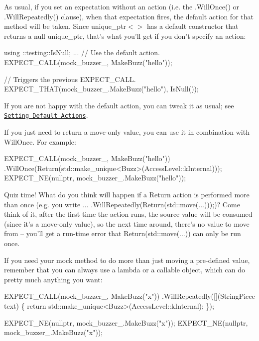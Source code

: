 As usual, if you set an expectation without an action (i.\+e. the {\ttfamily .Will\+Once()} or {\ttfamily .Will\+Repeatedly()} clause), when that expectation fires, the default action for that method will be taken. Since {\ttfamily unique\+\_\+ptr$<$$>$} has a default constructor that returns a null {\ttfamily unique\+\_\+ptr}, that’s what you’ll get if you don’t specify an action\+:


\begin{DoxyCode}
using ::testing::IsNull;
...
  \textcolor{comment}{// Use the default action.}
  EXPECT\_CALL(mock\_buzzer\_, MakeBuzz(\textcolor{stringliteral}{"hello"}));

  \textcolor{comment}{// Triggers the previous EXPECT\_CALL.}
  EXPECT\_THAT(mock\_buzzer\_.MakeBuzz(\textcolor{stringliteral}{"hello"}), IsNull());
\end{DoxyCode}


If you are not happy with the default action, you can tweak it as usual; see \href{#OnCall}{\tt Setting Default Actions}.

If you just need to return a move-\/only value, you can use it in combination with {\ttfamily Will\+Once}. For example\+:


\begin{DoxyCode}
EXPECT\_CALL(mock\_buzzer\_, MakeBuzz(\textcolor{stringliteral}{"hello"}))
    .WillOnce(Return(std::make\_unique<Buzz>(AccessLevel::kInternal)));
EXPECT\_NE(\textcolor{keyword}{nullptr}, mock\_buzzer\_.MakeBuzz(\textcolor{stringliteral}{"hello"}));
\end{DoxyCode}


Quiz time! What do you think will happen if a {\ttfamily Return} action is performed more than once (e.\+g. you write {\ttfamily ... .Will\+Repeatedly(Return(std\+::move(...)));})? Come think of it, after the first time the action runs, the source value will be consumed (since it’s a move-\/only value), so the next time around, there’s no value to move from -- you’ll get a run-\/time error that {\ttfamily Return(std\+::move(...))} can only be run once.

If you need your mock method to do more than just moving a pre-\/defined value, remember that you can always use a lambda or a callable object, which can do pretty much anything you want\+:


\begin{DoxyCode}
EXPECT\_CALL(mock\_buzzer\_, MakeBuzz(\textcolor{stringliteral}{"x"}))
    .WillRepeatedly([](StringPiece text) \{
      \textcolor{keywordflow}{return} std::make\_unique<Buzz>(AccessLevel::kInternal);
    \});

EXPECT\_NE(\textcolor{keyword}{nullptr}, mock\_buzzer\_.MakeBuzz(\textcolor{stringliteral}{"x"}));
EXPECT\_NE(\textcolor{keyword}{nullptr}, mock\_buzzer\_.MakeBuzz(\textcolor{stringliteral}{"x"}));
\end{DoxyCode}


